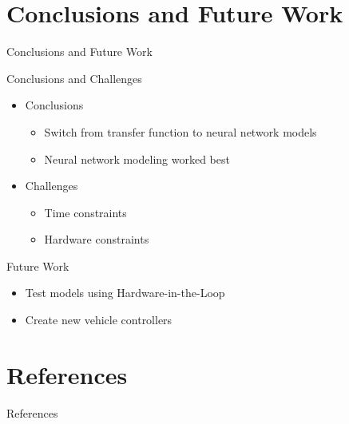 \documentclass{beamer}
\begin{document}

\section{Conclusions and Future Work}

\begin{frame}{Conclusions and Future Work}
  \begin{block}{Conclusions and Challenges}
    \begin{itemize}
      \item Conclusions
      \begin{itemize}
      	\item Switch from transfer function to neural network models
      	\item Neural network modeling worked best 
      \end{itemize}
      \item Challenges
        \begin{itemize}
      	\item Time constraints 
      	\item Hardware constraints 
      \end{itemize}
    \end{itemize}
  \end{block}
  \begin{block}{Future Work}
    \begin{itemize}
      \item Test models using Hardware-in-the-Loop
      \item Create new vehicle controllers 
    \end{itemize}
  \end{block}
\end{frame}


\section{References}

\begin{frame}[allowframebreaks]{References}
  
  
\end{frame}

\end{document}
